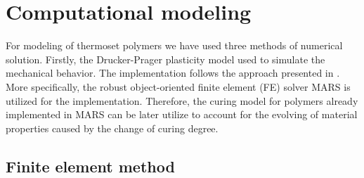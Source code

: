 \thispagestyle{plain}
\section{Computational modeling}
\indent

For modeling of thermoset polymers we have used three methods of numerical solution. Firstly, the Drucker-Prager plasticity model used to simulate the mechanical behavior. The implementation follows the approach presented in \cite{geofem}. More specifically, the robust object-oriented finite element (FE) solver MARS \cite{mars} is utilized for the implementation. Therefore, the curing model for polymers already implemented in MARS can be later utilize to account for the evolving of material properties caused by the change of curing degree.

\subsection{Finite element method}
\indent

